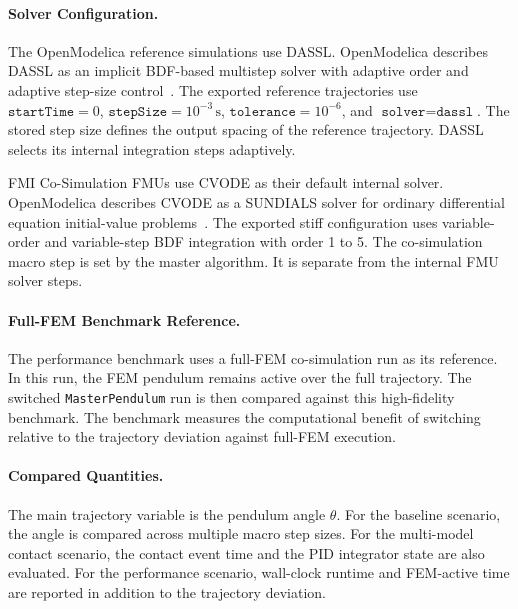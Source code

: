 \paragraph{Solver Configuration.}
The OpenModelica reference simulations use \ac{DASSL}.
OpenModelica describes \ac{DASSL} as an implicit \ac{BDF}-based multistep solver with adaptive order and adaptive step-size control~\cite{openmodelica_users_guide_2026}.
The exported reference trajectories use \(\texttt{startTime}=0\), \(\texttt{stepSize}=10^{-3}\,\mathrm{s}\), \(\texttt{tolerance}=10^{-6}\), and \(\texttt{solver}=\texttt{dassl}\).
The stored step size defines the output spacing of the reference trajectory.
\ac{DASSL} selects its internal integration steps adaptively.

\ac{FMI} Co-Simulation \acp{FMU} use \ac{CVODE} as their default internal solver.
OpenModelica describes \ac{CVODE} as a \ac{SUNDIALS} solver for ordinary differential equation initial-value problems~\cite{openmodelica_users_guide_2026}.
The exported stiff configuration uses variable-order and variable-step \ac{BDF} integration with order 1 to 5.
The co-simulation macro step is set by the master algorithm.
It is separate from the internal \ac{FMU} solver steps.

\paragraph{Full-FEM Benchmark Reference.}
The performance benchmark uses a full-\ac{FEM} co-simulation run as its reference.
In this run, the \ac{FEM} pendulum remains active over the full trajectory.
The switched \texttt{MasterPendulum} run is then compared against this high-fidelity benchmark.
The benchmark measures the computational benefit of switching relative to the trajectory deviation against full-\ac{FEM} execution.

\paragraph{Compared Quantities.}
The main trajectory variable is the pendulum angle $\theta$.
For the baseline scenario, the angle is compared across multiple macro step sizes.
For the multi-model contact scenario, the contact event time and the \ac{PID} integrator state are also evaluated.
For the performance scenario, wall-clock runtime and \ac{FEM}-active time are reported in addition to the trajectory deviation.

